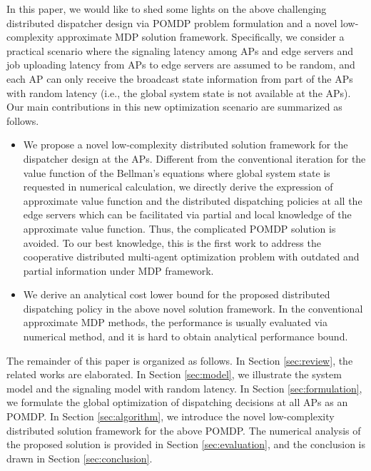 In this paper, we would like to shed some lights on the above challenging distributed dispatcher design via POMDP problem formulation and a novel low-complexity approximate MDP solution framework.
Specifically, we consider a practical scenario where the signaling latency among APs and edge servers and job uploading latency from APs to edge servers are assumed to be random, and each AP can only {receive the broadcast state information from part of the APs} with random latency (i.e., the global system state is not available at the APs).
Our main contributions in this new optimization scenario are summarized as follows.
\begin{itemize}
    \item We propose a novel low-complexity distributed solution framework for the dispatcher design at the APs.
    Different from the conventional iteration for the value function of the Bellman's equations where global system state is requested in numerical calculation,
    we directly derive the expression of approximate value function and the distributed dispatching policies at all the edge servers which can be facilitated via partial and local knowledge of the approximate value function.
    Thus, the complicated POMDP solution is avoided.
    To our best knowledge, this is the first work to address the cooperative distributed multi-agent optimization problem {with outdated and partial information} under MDP framework.
    \item We derive an analytical cost lower bound for the proposed distributed dispatching policy in the above novel solution framework. In the conventional approximate MDP methods, the performance is usually evaluated via numerical method, and it is hard to obtain analytical performance bound.
\end{itemize}

The remainder of this paper is organized as follows.
In Section \ref{sec:review}, the related works are elaborated.
In Section \ref{sec:model}, we illustrate the system model and the signaling model with random latency.
In Section \ref{sec:formulation}, we formulate the global optimization of dispatching decisions at all APs as an POMDP.
In Section \ref{sec:algorithm}, we introduce the novel low-complexity distributed solution framework for the above POMDP.
The numerical analysis of the proposed solution is provided in Section \ref{sec:evaluation}, and the conclusion is drawn in Section \ref{sec:conclusion}.

